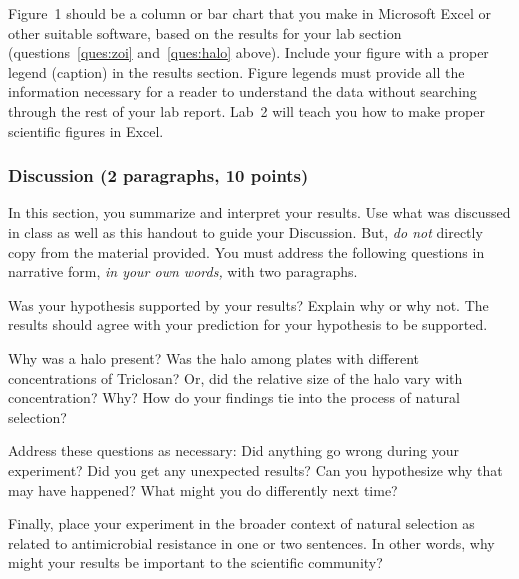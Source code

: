 \documentclass[12pt]{exam}
\begin{document}

Figure~1 should be a column or bar chart that you make in Microsoft Excel or other suitable software, based on the results for your lab section (questions~\ref{ques:zoi} and~\ref{ques:halo} above). Include your figure with a proper legend (caption) in the results section. Figure legends
must provide all the information necessary for a reader to understand
the data without searching through the rest of your lab report. Lab~2 will teach you how to make proper scientific figures in Excel.


\subsubsection*{Discussion (2 paragraphs, 10 points)} 

In this section, you summarize and interpret your results. Use what
was discussed in class as well as this handout to guide
your Discussion. But, \emph{do not} directly copy from the material provided.
You must address the following questions in narrative form, \emph{in your own words,} with two
paragraphs.

Was your hypothesis supported by your results? Explain why or why not. 
The results should agree with your prediction for your hypothesis to be supported. 

Why was a halo present? Was the halo among plates with different
concentrations of Triclosan? Or, did the relative size of the halo vary
with concentration? Why? How do your findings tie into the
process of natural selection?

Address these questions as necessary: Did anything go wrong during your
experiment? Did you get any unexpected results? Can you hypothesize
why that may have happened? What might you do differently next time?

Finally, place your experiment in the broader context of natural
selection as related to antimicrobial resistance in one or two
sentences. In other words, why might your results be important to the
scientific community?




	
\end{document}
